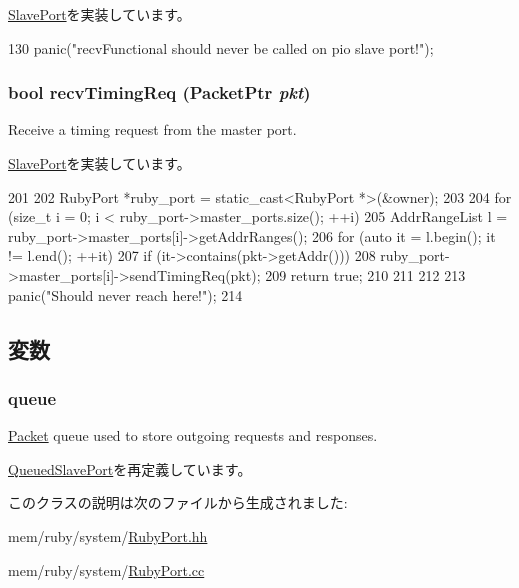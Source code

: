\hyperlink{classSlavePort_a6a3d6f2e5dab6bed16d53d9e7c17378d}{SlavePort}を実装しています。


\begin{DoxyCode}
130         { panic("recvFunctional should never be called on pio slave port!"); }
\end{DoxyCode}
\hypertarget{classRubyPort_1_1PioSlavePort_a3344d9dd0f83257feab5424e761f31c6}{
\subsubsection[{recvTimingReq}]{\setlength{\rightskip}{0pt plus 5cm}bool recvTimingReq ({\bf PacketPtr} {\em pkt})}}
\label{classRubyPort_1_1PioSlavePort_a3344d9dd0f83257feab5424e761f31c6}
Receive a timing request from the master port. 

\hyperlink{classSlavePort_abcece77e42f88ee41af8d3d01bb48253}{SlavePort}を実装しています。


\begin{DoxyCode}
201 {
202     RubyPort *ruby_port = static_cast<RubyPort *>(&owner);
203 
204     for (size_t i = 0; i < ruby_port->master_ports.size(); ++i) {
205         AddrRangeList l = ruby_port->master_ports[i]->getAddrRanges();
206         for (auto it = l.begin(); it != l.end(); ++it) {
207             if (it->contains(pkt->getAddr())) {
208                 ruby_port->master_ports[i]->sendTimingReq(pkt);
209                 return true;
210             }
211         }
212     }
213     panic("Should never reach here!\n");
214 }
\end{DoxyCode}


\subsection{変数}
\hypertarget{classRubyPort_1_1PioSlavePort_a3055168363a9ed42f38173363b6c1975}{
\subsubsection[{queue}]{ {\bf queue}}}
\label{classRubyPort_1_1PioSlavePort_a3055168363a9ed42f38173363b6c1975}
\hyperlink{classPacket}{Packet} queue used to store outgoing requests and responses. 

\hyperlink{classQueuedSlavePort_a89fcdbe2ab63d24f2112bc7e05bf2413}{QueuedSlavePort}を再定義しています。

このクラスの説明は次のファイルから生成されました:\begin{DoxyCompactItemize}
\item 
mem/ruby/system/\hyperlink{RubyPort_8hh}{RubyPort.hh}\item 
mem/ruby/system/\hyperlink{RubyPort_8cc}{RubyPort.cc}\end{DoxyCompactItemize}
